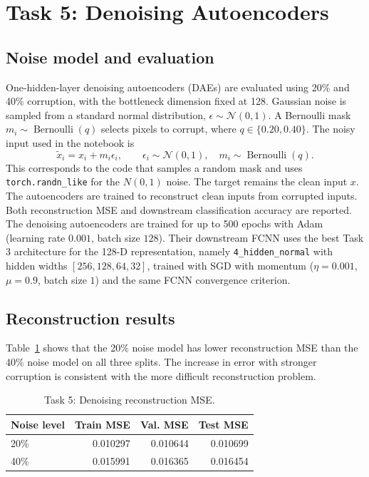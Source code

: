 \documentclass[conference,onecolumn]{IEEEtran}
\begin{document}

\FloatBarrier

\section{Task 5: Denoising Autoencoders}
\subsection{Noise model and evaluation}
One-hidden-layer denoising autoencoders (DAEs) are evaluated using 20\% and 40\% corruption, with the bottleneck dimension fixed at 128. Gaussian noise is sampled from a standard normal distribution, $\epsilon\sim
\mathcal{N}(0,1)$. A Bernoulli mask $m_i\sim\operatorname{Bernoulli}(q)$ selects
pixels to corrupt, where $q\in\{0.20,0.40\}$. The noisy input used in the notebook is
\begin{equation}
\tilde{x}_i=x_i+m_i\epsilon_i,\qquad
\epsilon_i\sim\mathcal{N}(0,1),\quad m_i\sim\operatorname{Bernoulli}(q).
\end{equation}
This corresponds to the code that samples a random mask and uses \texttt{torch.randn\_like}
for the $N(0,1)$ noise. The target remains the clean input $x$. The autoencoders are trained to reconstruct clean inputs from corrupted inputs. Both reconstruction MSE and downstream classification accuracy are reported. The
denoising autoencoders are trained for up to 500 epochs with Adam (learning rate
$0.001$, batch size $128$). Their downstream FCNN uses the best Task 3 architecture for
the 128-D representation, namely \texttt{4\_hidden\_normal} with hidden widths
$[256,128,64,32]$, trained with SGD with momentum ($\eta=0.001$, $\mu=0.9$,
batch size $1$) and the same FCNN convergence criterion.

\subsection{Reconstruction results}
Table~\ref{tab:dae-mse} shows that the 20\% noise model has lower reconstruction MSE than the 40\% noise model on all three splits. The increase in error with stronger corruption is consistent with the more difficult reconstruction problem.

\begin{table}[H]
\centering
\caption{Task 5: Denoising reconstruction MSE.}
\label{tab:dae-mse}
\begin{tabular}{l r r r}
\toprule
Noise level & Train MSE & Val. MSE & Test MSE\\
\midrule
20\% & 0.010297 & 0.010644 & 0.010699\\
40\% & 0.015991 & 0.016365 & 0.016454\\
\bottomrule
\end{tabular}
\end{table}
\end{document}
